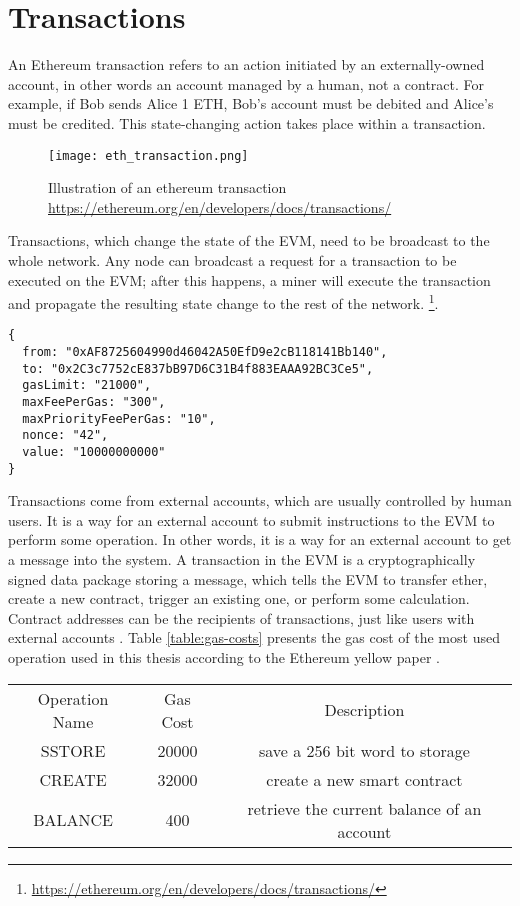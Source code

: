 \section{Transactions}
An Ethereum transaction refers to an action initiated by an externally-owned account, in other words an account managed by a human, not a contract. For example, if Bob sends Alice 1 ETH, Bob's account must be debited and Alice's must be credited. This state-changing action takes place within a transaction. 
\begin{figure}[h]
    \caption{Illustration of an ethereum transaction \url{https://ethereum.org/en/developers/docs/transactions/}}
    \centering
    \texttt{[image: eth\_transaction.png]}
\end{figure}
Transactions, which change the state of the EVM, need to be broadcast to the whole network. Any node can broadcast a request for a transaction to be executed on the EVM; after this happens, a miner will execute the transaction and propagate the resulting state change to the rest of the network. \footnote{\url{https://ethereum.org/en/developers/docs/transactions/}}.
\begin{verbatim}
{
  from: "0xAF8725604990d46042A50EfD9e2cB118141Bb140",
  to: "0x2C3c7752cE837bB97D6C31B4f883EAAA92BC3Ce5",
  gasLimit: "21000",
  maxFeePerGas: "300",
  maxPriorityFeePerGas: "10",
  nonce: "42",
  value: "10000000000"
}
\end{verbatim}
Transactions come from external accounts, which are usually controlled by human users. It is a way for an external account to submit instructions to the EVM to perform some operation. In other words, it is a way for an external account to get a message into the system. A transaction in the EVM is a cryptographically signed data package storing a message, which tells the EVM to transfer ether, create a new contract, trigger an existing one, or perform some calculation. Contract addresses can be the recipients of transactions, just like users with external accounts \cite[60]{dannen2017introducing}. 
Table \ref{table:gas-costs} presents the gas cost of the most used operation used in this thesis according to the Ethereum yellow paper \cite[27]{wood2014ethereum}.
\begin{center}
    \begin{tabular}{ c c c }\label{table:gas-costs}
     Operation Name & Gas Cost & Description \\ 
     SSTORE & 20000 & save a 256 bit word to storage \\  
     CREATE & 32000 & create a new smart contract  \\   
     BALANCE & 400 & retrieve the current balance of an account 
    \end{tabular}
\end{center}
